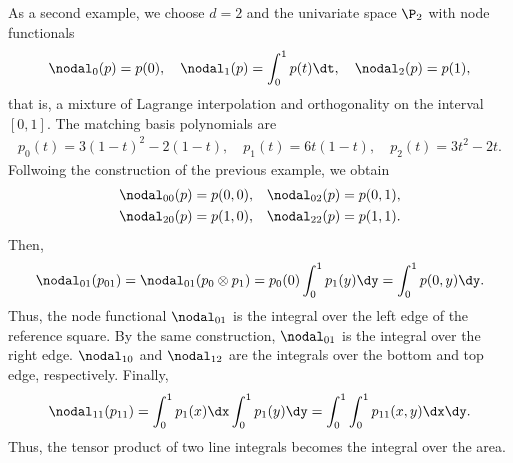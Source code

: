 \begin{example}
  As a second example, we choose $d=2$ and the univariate space $\P_2$ with node functionals
  \begin{gather}
    \nodal_0(p) = p(0),
    \quad \nodal_1(p) = \int_0^1 p(t) \dt,
    \quad \nodal_2(p) = p(1),
  \end{gather}
  that is, a mixture of Lagrange interpolation and orthogonality on
  the interval $[0,1]$. The matching basis polynomials are
  \begin{gather}
    p_0(t) = 3(1-t)^2 - 2(1-t),
    \quad p_1(t) = 6 t(1-t),
    \quad p_2(t) = 3t^2-2t.
  \end{gather}
  Follwoing the construction of the previous example, we obtain
  \begin{gather}
    \begin{aligned}
    \nodal_{00}(p) &= p(0,0),
    &\nodal_{02}(p) &= p(0,1),\\
    \nodal_{20}(p) &= p(1,0),
    &\nodal_{22}(p) &= p(1,1).
    \end{aligned}
  \end{gather}
  Then,
  \begin{gather}
    \nodal_{01}(p_{01}) = \nodal_{01}(p_0\otimes p_1)
    = p_0(0)\int_0^1 p_1(y)\dy
    = \int_0^1 p(0,y) \dy.
  \end{gather}
  Thus, the node functional $\nodal_{01}$ is the integral over the
  left edge of the reference square. By the same construction,
  $\nodal_{01}$ is the integral over the right edge. $\nodal_{10}$ and
  $\nodal_{12}$ are the integrals over the bottom and top edge,
  respectively. Finally,
  \begin{gather}
    \nodal_{11}(p_{11})
    = \int_0^1 p_1(x)\dx \int_0^1 p_1(y) \dy
    = \int_0^1\int_0^1 p_{11}(x,y) \dx\dy.
  \end{gather}
  Thus, the tensor product of two line integrals becomes the integral
  over the area.
\end{example}



